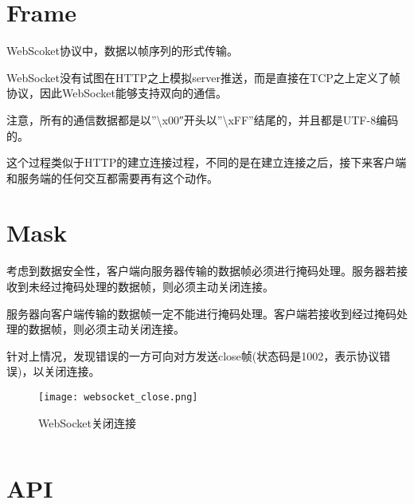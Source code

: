 \begin{lstlisting}[language=PHP]

\end{lstlisting}



\begin{lstlisting}[language=PHP]

\end{lstlisting}






\section{Frame}


WebScoket协议中，数据以帧序列的形式传输。

WebSocket没有试图在HTTP之上模拟server推送，而是直接在TCP之上定义了帧协议，因此WebSocket能够支持双向的通信。

注意，所有的通信数据都是以”\textbackslash x00″开头以”\textbackslash xFF”结尾的，并且都是UTF-8编码的。

这个过程类似于HTTP的建立连接过程，不同的是在建立连接之后，接下来客户端和服务端的任何交互都需要再有这个动作。

\section{Mask}


考虑到数据安全性，客户端向服务器传输的数据帧必须进行掩码处理。服务器若接收到未经过掩码处理的数据帧，则必须主动关闭连接。

服务器向客户端传输的数据帧一定不能进行掩码处理。客户端若接收到经过掩码处理的数据帧，则必须主动关闭连接。

针对上情况，发现错误的一方可向对方发送close帧(状态码是1002，表示协议错误)，以关闭连接。

\begin{figure}[htbp]
\centering
\texttt{[image: websocket\_close.png]}
\caption{WebSocket关闭连接}
\end{figure}




\begin{lstlisting}[language=PHP]

\end{lstlisting}

\section{API}






